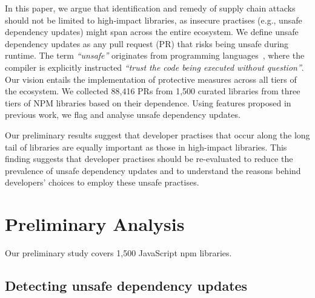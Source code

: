 \documentclass[sigconf,screen]{acmart}
\begin{document}
\begin{sloppy}
In this paper, we argue that identification and remedy of supply chain attacks should not be limited to high-impact libraries, as insecure practises (e.g., unsafe dependency updates) might span across the entire ecosystem. 
We define unsafe dependency updates as any pull request (PR) that risks being unsafe
during runtime.
The term \textit{``unsafe''} originates from programming languages~\citep{UnsafeRu41:online}, where the compiler is explicitly instructed \textit{``trust the code being executed without question''}. Our vision entails the implementation of protective measures across all tiers of the ecosystem.
We collected 88,416 PRs from 1,500 curated libraries from three tiers of NPM libraries based on their dependence. Using features proposed in previous work, we flag and analyse unsafe dependency updates.


Our preliminary results suggest that developer practises that occur along the long tail of libraries are equally important as those in high-impact libraries.
This finding suggests that developer practises should be re-evaluated to reduce the prevalence of unsafe dependency updates and to understand the reasons behind developers' choices to employ these unsafe practises.


\section{Preliminary Analysis}
Our preliminary study covers 1,500 JavaScript npm libraries.
\subsection{Detecting unsafe dependency updates}


\end{sloppy}
\end{document}
